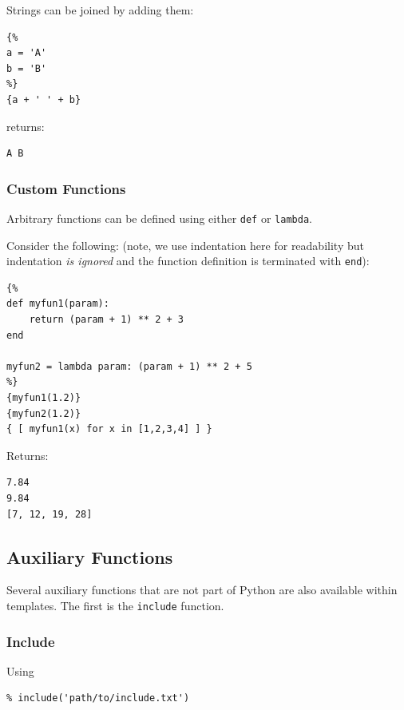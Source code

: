 {Strings can be joined by adding them:

\begin{verbatim}
{%
a = 'A'
b = 'B'
%}
{a + ' ' + b}
\end{verbatim}

returns:

\begin{verbatim}
A B
\end{verbatim}

\subsubsection{Custom Functions}\label{interfaces:custom-functions}

Arbitrary functions can be defined using either \texttt{def} or
\texttt{lambda}. 

Consider the following: (note, we use indentation here for readability
but indentation \emph{is ignored} and the function definition is
terminated with \texttt{end}):

\begin{verbatim}
{%
def myfun1(param):
    return (param + 1) ** 2 + 3
end

myfun2 = lambda param: (param + 1) ** 2 + 5
%}
{myfun1(1.2)}
{myfun2(1.2)}
{ [ myfun1(x) for x in [1,2,3,4] ] }
\end{verbatim}

Returns:

\begin{verbatim}
7.84
9.84
[7, 12, 19, 28]
\end{verbatim}

\subsection{Auxiliary Functions}\label{interfaces:auxiliary-functions}

Several auxiliary functions that are not part of Python are also available 
within templates. The first is the \texttt{include} function.

\subsubsection{Include}\label{interfaces:include}

Using

\begin{verbatim}
% include('path/to/include.txt')
\end{verbatim}

}
